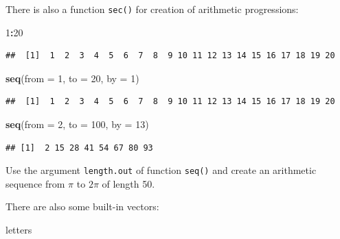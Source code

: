 \documentclass[
]{book}
\makeatletter
\newenvironment{Shaded}{\begin{snugshade}}{\end{snugshade}}
\newcommand{\DataTypeTok}[1]{\textcolor[rgb]{0.13,0.29,0.53}{#1}}
\newcommand{\DecValTok}[1]{\textcolor[rgb]{0.00,0.00,0.81}{#1}}
\newcommand{\KeywordTok}[1]{\textcolor[rgb]{0.13,0.29,0.53}{\textbf{#1}}}
\newcommand{\NormalTok}[1]{#1}
\newcommand{\OperatorTok}[1]{\textcolor[rgb]{0.81,0.36,0.00}{\textbf{#1}}}
\newenvironment{kframe}{%
\medskip{}
\setlength{\fboxsep}{.8em}
 \def\at@end@of@kframe{}%
 \ifinner\ifhmode%
  \def\at@end@of@kframe{\end{minipage}}%
  \begin{minipage}{\columnwidth}%
 \fi\fi%
 \def\FrameCommand##1{\hskip\@totalleftmargin \hskip-\fboxsep
 \colorbox{shadecolor}{##1}\hskip-\fboxsep
     \hskip-\linewidth \hskip-\@totalleftmargin \hskip\columnwidth}%
 \MakeFramed {\advance\hsize-\width
   \@totalleftmargin\z@ \linewidth\hsize
   \@setminipage}}%
 {\par\unskip\endMakeFramed%
 \at@end@of@kframe}
\newenvironment{rmdblock}[1]
  {
  \begin{itemize}
  \renewcommand{\labelitemi}{
    \raisebox{-.7\height}[0pt][0pt]{
      {\setkeys{Gin}{width=3em,keepaspectratio}\texttt{[image: images/\#1]}}
    }
  }
  \setlength{\fboxsep}{1em}
  \begin{kframe}
  \item
  }
  {
  \end{kframe}
  \end{itemize}
  }
\newenvironment{rmdtask}
  {\begin{rmdblock}{task}}
  {\end{rmdblock}}
\makeatother
\begin{document}
There is also a function \texttt{sec()} for creation of arithmetic progressions:

\begin{Shaded}
\begin{Highlighting}[]
\DecValTok{1}\OperatorTok{:}\DecValTok{20}
\end{Highlighting}
\end{Shaded}

\begin{verbatim}
##  [1]  1  2  3  4  5  6  7  8  9 10 11 12 13 14 15 16 17 18 19 20
\end{verbatim}

\begin{Shaded}
\begin{Highlighting}[]
\KeywordTok{seq}\NormalTok{(}\DataTypeTok{from =} \DecValTok{1}\NormalTok{, }\DataTypeTok{to =} \DecValTok{20}\NormalTok{, }\DataTypeTok{by =} \DecValTok{1}\NormalTok{)}
\end{Highlighting}
\end{Shaded}

\begin{verbatim}
##  [1]  1  2  3  4  5  6  7  8  9 10 11 12 13 14 15 16 17 18 19 20
\end{verbatim}

\begin{Shaded}
\begin{Highlighting}[]
\KeywordTok{seq}\NormalTok{(}\DataTypeTok{from =} \DecValTok{2}\NormalTok{, }\DataTypeTok{to =} \DecValTok{100}\NormalTok{, }\DataTypeTok{by =} \DecValTok{13}\NormalTok{)}
\end{Highlighting}
\end{Shaded}

\begin{verbatim}
## [1]  2 15 28 41 54 67 80 93
\end{verbatim}

\begin{rmdtask}
Use the argument \texttt{length.out} of function \texttt{seq()} and
create an arithmetic sequence from \(\pi\) to \(2\pi\) of length 50.
\end{rmdtask}

There are also some built-in vectors:

\begin{Shaded}
\begin{Highlighting}[]
\NormalTok{letters}
\end{Highlighting}
\end{Shaded}
\end{document}
